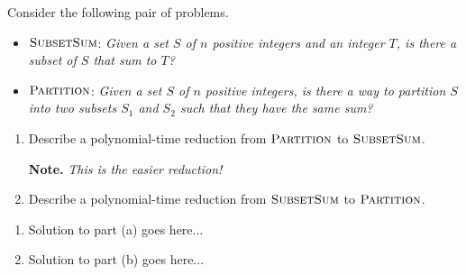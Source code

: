 \documentclass{article}
\begin{document}
\begin{question}
Consider the following pair of problems.

\begin{itemize}
    \item $\mathsf{\textsc{SubsetSum}}$: {\em Given a set $S$ of $n$ positive integers and an integer $T$, is there a subset of $S$ that sum to $T$?}
    \item $\mathsf{\textsc{Partition}}$: {\em Given a set $S$ of $n$ positive integers, is there a way to partition $S$ into two subsets $S_1$ and $S_2$ such that they have the same sum?}
\end{itemize}

\begin{enumerate}[label = (\alph*)]

    \item Describe a polynomial-time reduction from $\mathsf{\textsc{Partition}}$ to $\mathsf{\textsc{SubsetSum}}$.

    {\bfseries Note.} {\em This is the easier reduction!}
    
    \item Describe a polynomial-time reduction from $\mathsf{\textsc{SubsetSum}}$ to $\mathsf{\textsc{Partition}}$.
\end{enumerate}
\end{question}

\begin{solution}
\begin{enumerate}[label = (\alph*)]
    \item Solution to part (a) goes here...

    \item Solution to part (b) goes here...
\end{enumerate}
\end{solution}
\end{document}
